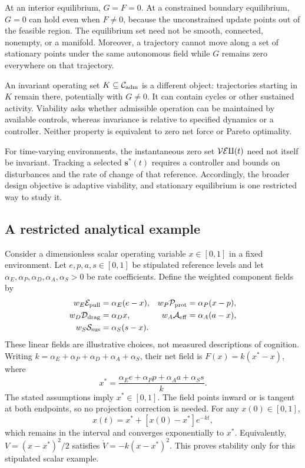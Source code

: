 At an interior equilibrium, $G=F=0$. At a constrained boundary equilibrium, $G=0$ can hold even when $F\neq0$, because the unconstrained update points out of the feasible region. The equilibrium set need not be smooth, connected, nonempty, or a manifold. Moreover, a trajectory cannot move along a set of stationary points under the same autonomous field while $G$ remains zero everywhere on that trajectory.

An invariant operating set $K\subseteq\mathcal{C}_{\mathrm{adm}}$ is a different object: trajectories starting in $K$ remain there, potentially with $G\neq0$. It can contain cycles or other sustained activity. Viability asks whether admissible operation can be maintained by available controls, whereas invariance is relative to specified dynamics or a controller. Neither property is equivalent to zero net force or Pareto optimality.

For time-varying environments, the instantaneous zero set $\mathcal{VEq}(t)$ need not itself be invariant. Tracking a selected $\mathbf{s}^*(t)$ requires a controller and bounds on disturbances and the rate of change of that reference. Accordingly, the broader \uvif{} design objective is adaptive viability, and stationary equilibrium is one restricted way to study it.

\subsection{A restricted analytical example}
\label{subsec:example}
Consider a dimensionless scalar operating variable $x\in[0,1]$ in a fixed environment. Let $e,p,a,s\in[0,1]$ be stipulated reference levels and let $\alpha_E,\alpha_P,\alpha_D,\alpha_A,\alpha_S>0$ be rate coefficients. Define the weighted component fields by
\begin{align}
 w_E\mathcal{E}_{\mathrm{pull}}&=\alpha_E(e-x), & w_P\mathcal{P}_{\mathrm{prot}}&=\alpha_P(x-p),\nonumber\\
 w_D\mathcal{D}_{\mathrm{drag}}&=\alpha_Dx, & w_A\mathcal{A}_{\mathrm{eff}}&=\alpha_A(a-x),\nonumber\\
 w_S\mathcal{S}_{\mathrm{sus}}&=\alpha_S(s-x).&&
 \label{eq:toy_fields}
\end{align}
These linear fields are illustrative choices, not measured descriptions of cognition. Writing $k=\alpha_E+\alpha_P+\alpha_D+\alpha_A+\alpha_S$, their net field is $F(x)=k(x^*-x)$, where
\begin{equation}
 x^*=\frac{\alpha_E e+\alpha_P p+\alpha_A a+\alpha_S s}{k}.
 \label{eq:toy_equilibrium}
\end{equation}
The stated assumptions imply $x^*\in[0,1]$. The field points inward or is tangent at both endpoints, so no projection correction is needed. For any $x(0)\in[0,1]$,
\begin{equation}
 x(t)=x^*+[x(0)-x^*]e^{-kt},
 \label{eq:toy_solution}
\end{equation}
which remains in the interval and converges exponentially to $x^*$. Equivalently, $V=(x-x^*)^2/2$ satisfies $\dot V=-k(x-x^*)^2$. This proves stability only for this stipulated scalar example.

